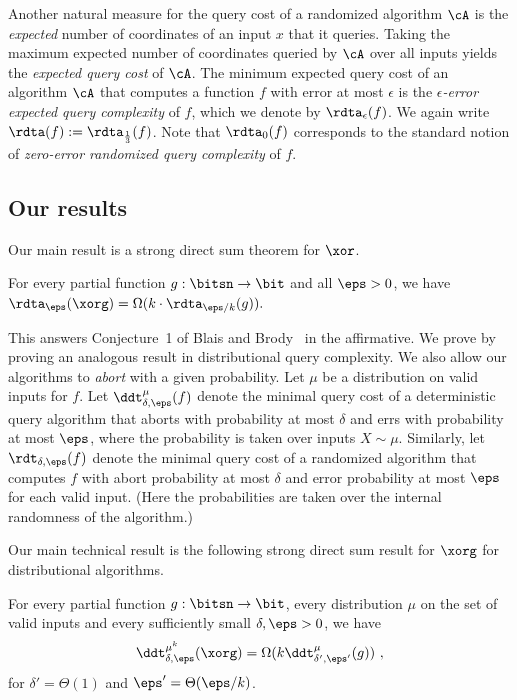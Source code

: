 \documentclass{toc}
\begin{document}
Another natural measure for the query cost of a randomized algorithm
$\cA$ is the \emph{expected} number of coordinates of an input $x$
that it queries.   %
%
%
%
Taking the maximum expected number of coordinates
queried by $\cA$ over all inputs yields the %
\emph{expected query cost} %
of $\cA$. The minimum %
expected  %
query cost of an algorithm $\cA$
that computes a function $f$ with error at most $\epsilon$ is the
%
\emph{$\epsilon$-error expected query complexity} %
of $f$, which we
denote by $\rdta_{\epsilon}(f)$.   %
%
%
%
We again write $\rdta(f) := \rdta_{\frac 13}(f)$. Note that
$\rdta_0(f)$ corresponds to the standard notion of
\emph{zero-error randomized query complexity} of $f$.
%
%
%
%
%

%
\subsection{Our results}

Our main result is a strong direct sum theorem for $\xor$.

\begin{theorem}\label{thm:sds-xor}
  For every
  partial %
  function $g:\bitsn \rightarrow \bit$ and all $\eps>0$, we
  have $\rdta_\eps(\xorg) = \Omega(k\cdot \rdta_{\eps/k}(g)).$
\end{theorem}

%
%
%
%
%
%
%
%
%
%
%
%
%
%
 This answers Conjecture~1 of Blais and
Brody~\cite{BlaisB19} in the affirmative.  We prove
 by proving an analogous result in
distributional query complexity.  %
%
%
We also allow our algorithms to \emph{abort} with 
%
%
%
%
%
a given  %
probability.
Let $\mu$ be a distribution on valid inputs for $f$. %
Let $\ddt_{\delta,\eps}^\mu(f)$ denote the minimal query cost of a
deterministic query algorithm that aborts with probability at most
$\delta$ and errs with probability at most $\eps$, where the
probability is taken over inputs $X \sim \mu$.  %
%
Similarly, let
$\rdt_{\delta,\eps}(f)$ denote the minimal query cost of a randomized
algorithm that computes $f$ with abort probability at most $\delta$
and error probability at most $\eps$ %
for each
valid %
input. %
%
(Here the  %
probabilities are taken over the internal randomness of 
the algorithm.)

Our main technical result is the following strong direct sum result
for $\xorg$ for distributional algorithms.
\begin{lemma}\label{lemma:main}
  For every
  partial %
  function $g:\bitsn \rightarrow \bit$, every distribution
  $\mu$
  on the set of valid inputs  %
  and every
  sufficiently small  %
  $\delta,\eps>0$, we have
  $$\ddt_{\delta,\eps}^{\mu^k}(\xorg) =
  \Omega(k\ddt_{\delta',\eps'}^\mu(g))\ ,$$ for $\delta' = \Theta(1)$
  and $\eps' = \Theta(\eps/k)$.
\end{lemma}
\end{document}
